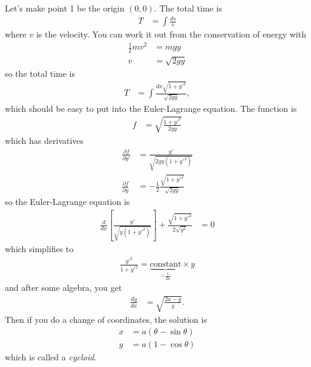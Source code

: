 Let's make point 1 be the origin $(0, 0)$.
The total time is
\begin{align}
    T &=
    \int \frac{ds}{v}
\end{align}
where $v$ is the velocity.
You can work it out from the conservation of energy with
\begin{align}
    \frac{1}{2}mv^2 &= mgy\\
    v &= \sqrt{2 gy}
\end{align}
so the total time is
\begin{align}
    T &=
    \int
    \frac{dx\sqrt{1 + y'^2}}{\sqrt{2gy}},
\end{align}
which should be easy to put into the Euler-Lagrange equation.
The function is
\begin{align}
    f &=
    \sqrt{\frac{1 + y'^2}{2gy}}
\end{align}
which has derivatives
\begin{align}
    \frac{\partial f}{\partial y'} &=
    \frac{y'}{\sqrt{2gy(1 + y'^2)}}\\
    \frac{\partial f}{\partial y} &=
    -\frac{1}{2}
    \frac{\sqrt{1 + y'^2}}{\sqrt{2gy}}
\end{align}
so the Euler-Lagrange equation is
\begin{align}
    \frac{d}{dx}\left[ 
        \frac{y'}{\sqrt{y(1 + y'^2)}}
    \right]
    +
    \frac{\sqrt{1 + y'^2}}{2\sqrt{y^2}}
    &= 0
\end{align}
which simplifies to
\begin{align}
    \frac{y'^2}{1 + y'^2} =
    \underbrace{\text{constant}}_{-\frac{1}{2a}}\times y
\end{align}
and after some algebra,
you get
\begin{align}
    \frac{dy}{dx} &=
    \sqrt{\frac{2a - y}{y}}.
\end{align}
Then if you do a change of coordinates,
the solution is
\begin{align}
    x &= a(\theta - \sin\theta)\\
    y &= a ( 1 - \cos\theta)
\end{align}
which is called a \emph{cycloid}.
